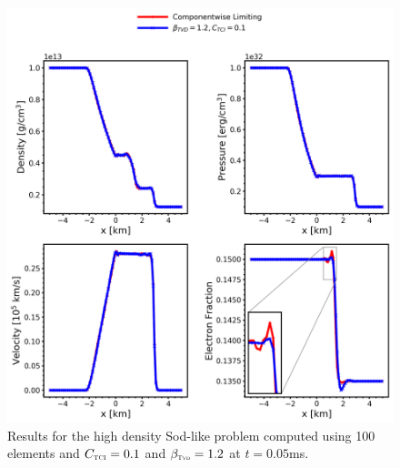 \documentclass[onecolumn]{aastex62}
\newcommand{\TVD}{\textnormal{\tiny\textsc{Tvd}}}
\newcommand{\TCI}{\textnormal{\tiny\textsc{TCI}}}
\begin{document}
\begin{figure}[h!]
  \centering
  \includegraphics[width=36pc]{./figures/highDens.png}
  \caption{\label{fig:SodSedovHighDens} Results for the high density Sod-like problem
  computed using 100 elements and $C_{\TCI} = 0.1$ and $\beta_{\TVD} = 1.2$ at $t=0.05$ms.}
\end{figure}
\end{document}
